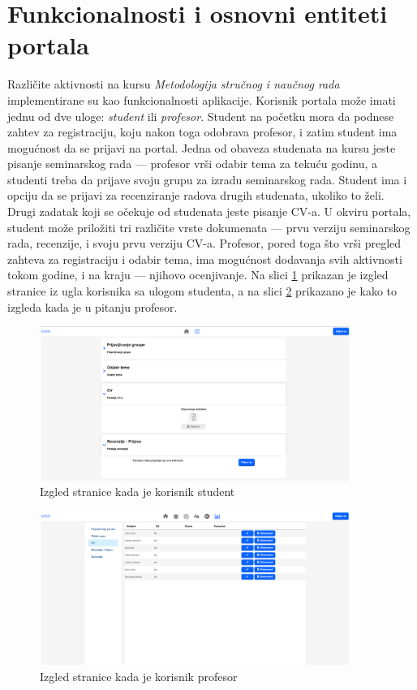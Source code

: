 \documentclass[12pt,oneside]{memoir}
\begin{document}
\section{Funkcionalnosti i osnovni entiteti portala}
\label{sec:entiteti}
\par Različite aktivnosti na kursu \emph{Metodologija stručnog i naučnog rada} implementirane su kao funkcionalnosti aplikacije. Korisnik portala može imati jednu od dve uloge: \emph{student} ili \emph{profesor}. Student na početku mora da podnese zahtev za registraciju, koju nakon toga odobrava profesor, i zatim student ima mogućnost da se prijavi na portal. Jedna od obaveza studenata na kursu jeste pisanje seminarskog rada --- profesor vrši odabir tema za tekuću godinu, a studenti treba da prijave svoju grupu za izradu seminarskog rada. Student ima i opciju da se prijavi za recenziranje radova drugih studenata, ukoliko to želi. Drugi zadatak koji se očekuje od studenata jeste pisanje CV-a. U okviru portala, student može priložiti tri različite vrste dokumenata --- prvu verziju seminarskog rada, recenzije, i svoju prvu verziju CV-a. Profesor, pored toga što vrši pregled zahteva za registraciju i odabir tema, ima mogućnost dodavanja svih aktivnosti tokom godine, i na kraju --- njihovo ocenjivanje. Na slici \ref{fig:studentpage} prikazan je izgled stranice iz ugla korisnika sa ulogom studenta, a na slici \ref{fig:profpage} prikazano je kako to izgleda kada je u pitanju profesor. 

\begin{figure}[!ht]
  \centering

  \includegraphics[width=0.9\textwidth]{student-page.png}
  \caption{Izgled stranice kada je korisnik student \cite{rad}}
   \label{fig:studentpage}
\end{figure}

\begin{figure}[!ht]
  \centering
  \includegraphics[width=0.9\textwidth]{professor-page.png}
  \caption{Izgled stranice kada je korisnik profesor \cite{rad}}
  \label{fig:profpage}
\end{figure}
\end{document}
